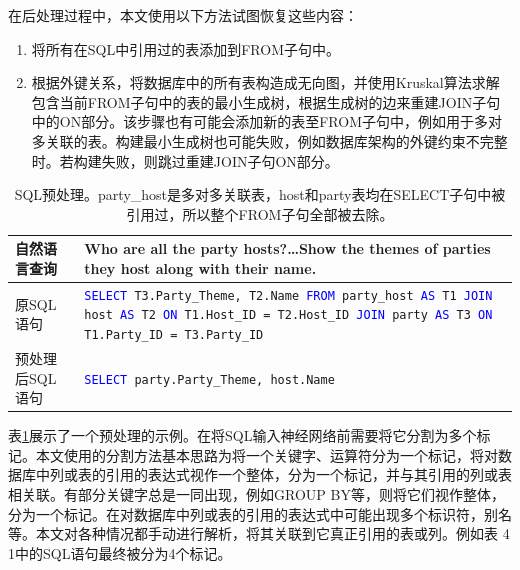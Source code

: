 在后处理过程中，本文使用以下方法试图恢复这些内容：
\begin{enumerate}
    \item 将所有在SQL中引用过的表添加到FROM子句中。
    \item 根据外键关系，将数据库中的所有表构造成无向图，并使用Kruskal算法求解包含当前FROM子句中的表的最小生成树，根据生成树的边来重建JOIN子句中的ON部分。该步骤也有可能会添加新的表至FROM子句中，例如用于多对多关联的表。构建最小生成树也可能失败，例如数据库架构的外键约束不完整时。若构建失败，则跳过重建JOIN子句ON部分。
\end{enumerate}

\begin{table}
    \def\sql#1{\texttt{#1}}
    \def\kw#1{\textcolor{blue}{#1}}
    \def\SELECT{\kw{SELECT }}
    \def\FROM{\kw{FROM }}
    \def\JOIN{\kw{JOIN }}
    \def\AS{\kw{AS }}
    \def\ON{\kw{ON }}

    \begin{tabularx}{\textwidth}{l|X}
    \hline
    自然语言查询 & Who are all the party hosts?…\newline Show the themes of parties they host along with their name.\\ \hline
    原SQL语句 &
    \sql{\SELECT T3.Party\_Theme, T2.Name \FROM party\_host \AS T1 \newline
        \-\hspace{2em} \JOIN host \AS T2 \ON T1.Host\_ID = T2.Host\_ID \newline
        \-\hspace{2em} \JOIN party \AS T3 \ON T1.Party\_ID = T3.Party\_ID} \\ \hline
    预处理后SQL语句 &
    \sql{\SELECT party.Party\_Theme, host.Name} \\ \hline
    \end{tabularx}
    \caption{SQL预处理。party\_host是多对多关联表，host和party表均在SELECT子句中被引用过，所以整个FROM子句全部被去除。}
    \label{preprocess-eg}
\end{table}

表\ref{preprocess-eg}展示了一个预处理的示例。在将SQL输入神经网络前需要将它分割为多个标记。本文使用的分割方法基本思路为将一个关键字、运算符分为一个标记，将对数据库中列或表的引用的表达式视作一个整体，分为一个标记，并与其引用的列或表相关联。有部分关键字总是一同出现，例如GROUP BY等，则将它们视作整体，分为一个标记。在对数据库中列或表的引用的表达式中可能出现多个标识符，别名等。本文对各种情况都手动进行解析，将其关联到它真正引用的表或列。例如表 4 1中的SQL语句最终被分为4个标记。

